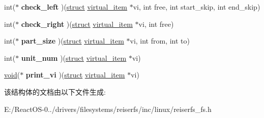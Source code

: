 \begin{DoxyCompactItemize}
\item 
\mbox{\label{structitem__operations_a5c18bef748d9f2ca7846852c35308a33}} 
int($\ast$ {\bfseries check\+\_\+left} )(\hyperlink{interfacestruct}{struct} \hyperlink{structvirtual__item}{virtual\+\_\+item} $\ast$vi, int free, int start\+\_\+skip, int end\+\_\+skip)
\item 
\mbox{\label{structitem__operations_adf7a8ee63c85d532a431a99cc366b76f}} 
int($\ast$ {\bfseries check\+\_\+right} )(\hyperlink{interfacestruct}{struct} \hyperlink{structvirtual__item}{virtual\+\_\+item} $\ast$vi, int free)
\item 
\mbox{\label{structitem__operations_a7815b6a4ba58a0f8b77cf2ca97802a02}} 
int($\ast$ {\bfseries part\+\_\+size} )(\hyperlink{interfacestruct}{struct} \hyperlink{structvirtual__item}{virtual\+\_\+item} $\ast$vi, int from, int to)
\item 
\mbox{\label{structitem__operations_ace86d65420e88e2cf77cf79ff4665cdc}} 
int($\ast$ {\bfseries unit\+\_\+num} )(\hyperlink{interfacestruct}{struct} \hyperlink{structvirtual__item}{virtual\+\_\+item} $\ast$vi)
\item 
\mbox{\label{structitem__operations_a24a5bc8a594385cbccd5863c06d2c98e}} 
\hyperlink{interfacevoid}{void}($\ast$ {\bfseries print\+\_\+vi} )(\hyperlink{interfacestruct}{struct} \hyperlink{structvirtual__item}{virtual\+\_\+item} $\ast$vi)
\end{DoxyCompactItemize}


该结构体的文档由以下文件生成\+:\begin{DoxyCompactItemize}
\item 
E\+:/\+React\+O\+S-\/0../drivers/filesystems/reiserfs/inc/linux/reiserfs\+\_\+fs.\+h\end{DoxyCompactItemize}
